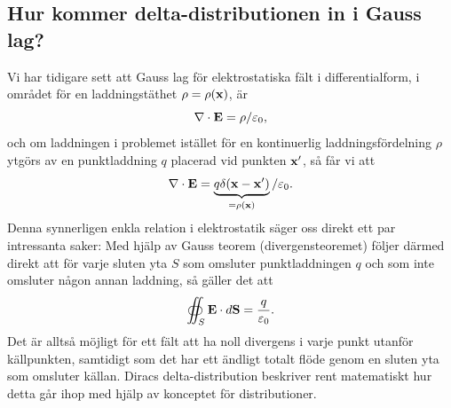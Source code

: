 \subsection{Hur kommer delta-distributionen in i Gauss lag?}
Vi har tidigare sett att Gauss lag f{\"o}r elektrostatiska f{\"a}lt i
differentialform, i omr{\aa}det f{\"o}r en laddningst{\"a}thet
$\rho=\rho({\bf x})$, {\"a}r
$$
  \nabla\cdot{\bf E}=\rho/\varepsilon_0,
$$
och om laddningen i problemet ist{\"a}llet f{\"o}r en kontinuerlig
laddningsf{\"o}rdelning $\rho$ ytg{\"o}rs av en punktladdning $q$ placerad
vid punkten ${\bf x}'$, s{\aa} f{\aa}r vi att
$$
  \nabla\cdot{\bf E}
    =\underbrace{
        q\delta({\bf x}-{\bf x}')
     }_{=\rho({\bf x})}/\varepsilon_0.
$$
Denna synnerligen enkla relation i elektrostatik s{\"a}ger oss direkt ett par
intressanta saker:
\noindent
Med hj{\"a}lp av Gauss teorem (divergensteoremet) f{\"o}ljer d{\"a}rmed direkt
att f{\"o}r varje sluten yta $S$ som omsluter punktladdningen $q$ och som inte
omsluter n{\aa}gon annan laddning, s{\aa} g{\"a}ller det att
$$
  \oiint_S{\bf E}\cdot d{\bf S} = {{q}\over{\varepsilon_0}}.
$$
Det {\"a}r allts{\aa} m{\"o}jligt f{\"o}r ett f{\"a}lt att ha noll divergens i
varje punkt utanf{\"o}r k{\"a}llpunkten, samtidigt som det har ett {\"a}ndligt
totalt fl{\"o}de genom en sluten yta som omsluter k{\"a}llan.
Diracs delta-distribution beskriver rent matematiskt hur detta g{\aa}r ihop
med hj{\"a}lp av konceptet f{\"o}r distributioner.

